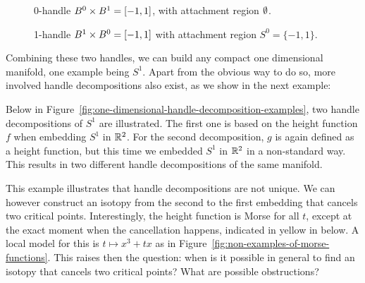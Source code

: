 \begin{description}
    \item[] 0-handle $B^{0} \times B^{1} = [-1, 1]$, with attachment region $\emptyset$.
        
    \item[] 1-handle   $B^{1} \times  B^{0} = [-1, 1]$ with attachment region $S^{0} = \{-1, 1\}$.
\end{description}
Combining these two handles, we can build any compact one dimensional manifold, one example being $S^{1}$. 
Apart from the obvious way to do so, more involved handle decompositions also exist, as we show in the next example:

\begin{eg}
    Below in Figure~\ref{fig:one-dimensional-handle-decomposition-examples}, two handle decompositions of $S^{1}$ are illustrated.
    The first one is based on the height function $f$ when embedding $S^{1}$ in $\mathbb{R}^2$.
    For the second decomposition, $g$ is again defined as a height function, but this time we embedded $S^{1}$ in $ \mathbb{R}^2$ in a non-standard way.
    This results in two different handle decompositions of the same manifold.
\end{eg}
\begin{figure}[H]
    \centering
\end{figure}
This example illustrates that handle decompositions are not unique.
We can however construct an isotopy from the second to the first embedding that cancels two critical points.
Interestingly, the height function is Morse for all $t$, except at the exact moment when the cancellation happens, indicated in yellow in below.
A local model for this is $t\mapsto x^3 + tx$ as in Figure~\ref{fig:non-examples-of-morse-functions}.
This raises then the question: when is it possible in general to find an isotopy that cancels two critical points? What are possible obstructions?
\begin{figure}[H]
    \centering
\end{figure}


